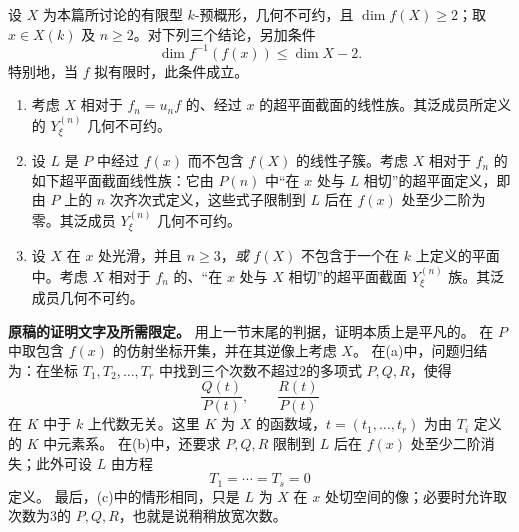 
设 $X$ 为本篇所讨论的有限型 $k$-预概形，几何不可约，且 $\dim f(X)\ge2$；取 $x\in X(k)$ 及 $n\ge2$。对下列三个结论，另加条件
\[
\dim f^{-1}(f(x))\leq \dim X-2.\tag{9.3*}
\]
特别地，当 $f$ 拟有限时，此条件成立。
\begin{enumerate}
\item[(a)] 考虑 $X$ 相对于 $f_n=u_n f$ 的、经过 $x$ 的超平面截面的线性族。其泛成员所定义的 $Y^{(n)}_\xi$ 几何不可约。
\item[(b)] 设 $L$ 是 $P$ 中经过 $f(x)$ 而不包含 $f(X)$ 的线性子簇。考虑 $X$ 相对于 $f_n$ 的如下超平面截面线性族：它由 $P(n)$ 中“在 $x$ 处与 $L$ 相切”的超平面定义，即由 $P$ 上的 $n$ 次齐次式定义，这些式子限制到 $L$ 后在 $f(x)$ 处至少二阶为零。其泛成员 $Y^{(n)}_\xi$ 几何不可约。
\item[(c)] 设 $X$ 在 $x$ 处光滑，并且 $n\ge3$，\emph{或} $f(X)$ 不包含于一个在 $k$ 上定义的平面中。考虑 $X$ 相对于 $f_n$ 的、“在 $x$ 处与 $X$ 相切”的超平面截面 $Y^{(n)}_\xi$ 族。其泛成员几何不可约。
\end{enumerate}

\noindent\textbf{原稿的证明文字及所需限定。}
用上一节末尾的判据，证明本质上是平凡的。
在 $P$ 中取包含 $f(x)$ 的仿射坐标开集，并在其逆像上考虑 $X$。
在(a)中，问题归结为：在坐标 $T_1,T_2,\ldots,T_r$ 中找到三个次数不超过2的多项式 $P,Q,R$，使得
\[
\frac{Q(t)}{P(t)},\qquad \frac{R(t)}{P(t)}
\]
在 $K$ 中于 $k$ 上代数无关。这里 $K$ 为 $X$ 的函数域，$t=(t_1,\ldots,t_r)$ 为由 $T_i$ 定义的 $K$ 中元素系。
在(b)中，还要求 $P,Q,R$ 限制到 $L$ 后在 $f(x)$ 处至少二阶消失；此外可设 $L$ 由方程
\[
T_1=\cdots=T_s=0
\]
定义。
最后，(c)中的情形相同，只是 $L$ 为 $X$ 在 $x$ 处切空间的像；必要时允许取次数为3的 $P,Q,R$，也就是说稍稍放宽次数。

